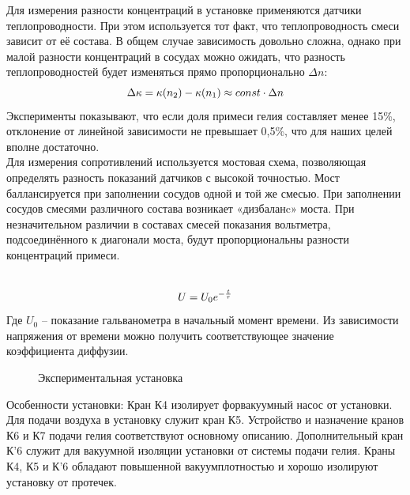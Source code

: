 \documentclass[a4paper, 12pt]{article}%
\begin{document}
	
Для измерения разности концентраций в установке применяются датчики теплопроводности. При этом используется тот факт, что теплопроводность смеси зависит от её состава. В общем случае зависимость довольно сложна, однако при малой разности концентраций в сосудах можно ожидать, что разность теплопроводностей будет изменяться прямо пропорционально $\Delta n$:
$$
	\Delta \kappa = \kappa (n_2) - \kappa (n_1) \approx const \cdot \Delta n\\
$$
Эксперименты показывают, что если доля примеси гелия составляет менее 15\%, отклонение от линейной зависимости не превышает 0,5\%, что для наших целей вполне достаточно.\\
Для измерения сопротивлений используется мостовая схема, позволяющая определять разность показаний датчиков с высокой точностью. Мост баллансируется при заполнении сосудов одной и той же смесью. При заполнении сосудов смесями различного состава возникает «дизбаланc» моста. При незначительном различии в составах смесей показания вольтметра, подсоединённого к диагонали моста, будут пропорциональны разности концентраций примеси.\\\

$$	U = U_0 e^{-\frac{t}{\tau}}\\$$
Где $U_0$ -- показание гальванометра в начальный момент времени. Из зависимости напряжения от времени можно получить соответствующее значение коэффициента диффузии. \\


	\begin{figure}[h]
	\caption{Экспериментальная установка}
\end{figure}

Особенности установки: Кран К4 изолирует форвакуумный насос от установки. Для подачи воздуха в установку служит кран К5.
Устройство и назначение кранов К6 и К7 подачи гелия соответствуют основному описанию. Дополнительный кран К'6 служит для вакуумной изоляции установки от системы подачи гелия. Краны К4, К5 и К'6 обладают повышенной вакуумплотностью и хорошо изолируют установку от протечек.
\end{document}
